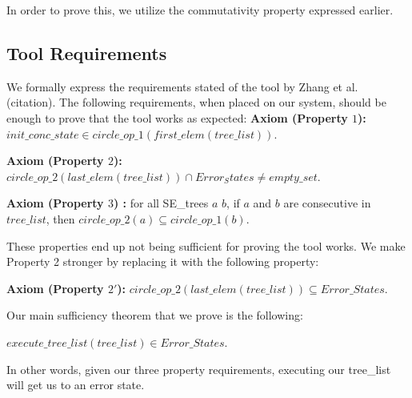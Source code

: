 In order to prove this, we utilize the commutativity property expressed earlier.


\subsection{Tool Requirements}
We formally express the requirements stated of the tool by Zhang et al. (citation).
The following requirements, when placed on our system, should be enough to prove that the tool works as expected:
\textbf{Axiom (Property $1$):} 
$init\_conc\_state \in circle\_op\_1 (first\_elem (tree\_list))$.

\textbf{Axiom (Property $2$):}
$ circle\_op\_2 (last\_elem (tree\_list)) \cap Error_States 
\neq empty\_set $.

\textbf{Axiom (Property $3$) :} 
for all SE\_trees $a$ $b$, 
if $a$ and $b$ are consecutive in $tree\_list$, then 
$circle\_op\_2 (a) \subseteq
circle\_op\_1 (b) $.

These properties end up not being sufficient for proving the tool works. 
We make Property 2 stronger by replacing it with the following property:

\textbf{Axiom (Property $2'$):}
$circle\_op\_2 (last\_elem (tree\_list))
\subseteq Error\_States $.



Our main sufficiency theorem that we prove is the following:
\begin{theorem}
$execute\_tree\_list (tree\_list) \in Error\_States$.
\end{theorem}
 In other words, given our three property requirements, executing our tree\_list will get us to an error state.
